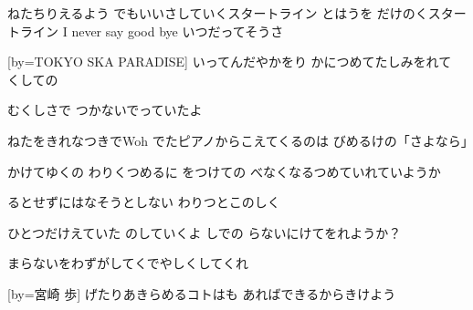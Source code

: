 \documentclass{article}
\newenvironment{Japanese}{%
\CJKfamily{min}%
\CJKtilde
\CJKnospace}{}
\begin{document}
\begin{CJK}{UTF8}{}
\begin{Japanese}
\begin{songs}{}
ねたちりえるよう
でもいいさしていくスタートライン
とはうを
だけのくスタートライン
I never say good bye
いつだってそうさ

\endverse
\endsong

[by=TOKYO SKA PARADISE]
\beginverse
{}いってんだやかをり
かにつめてたしみをれて
くしての

むくしさで
つかないでっていたよ

ねたをきれなつきでWoh
でたピアノからこえてくるのは
びめるけの「さよなら」

かけてゆくの
わりくつめるに
をつけての
べなくなるつめていれていようか

るとせずにはなそうとしない
わりつとこのしく

ひとつだけえていた
のしていくよ
しでの
らないにけてをれようか？

まらないをわずがしてくでやしくしてくれ

\endverse
\endsong

[by=宮崎 歩]
\beginverse
{}げたりあきらめるコトはも
あればできるからきけよう


\end{songs}
\end{Japanese}
\end{CJK}
\end{document}
